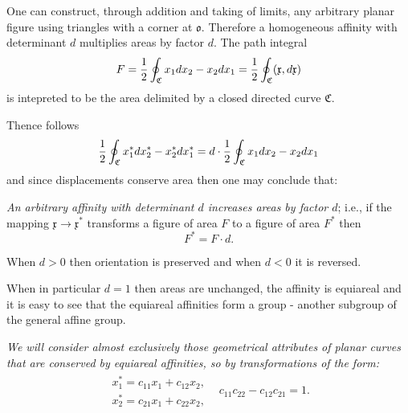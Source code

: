 \documentclass[11pt]{book} \usepackage{amssymb}
\newcommand{\myvec}[1]{\mathfrak{#1}}
\newcommand{\vecx}{\myvec{x}}
\begin{document}
One can construct, through addition and taking of limits, any arbitrary 
planar figure using triangles with a corner at $\myvec{o}$. Therefore a 
homogeneous affinity with determinant $d$ multiplies areas by factor $d$.
The path integral
\begin{equation}
  \label{eq:curve_area}
  F={1\over 2}\oint_\mathfrak{C}x_1dx_2-x_2dx_1
  ={1\over 2}\oint_\mathfrak{C}(\vecx,d\vecx)
\end{equation}
is intepreted to be the area delimited by a closed directed curve 
$\mathfrak{C}$.
\begin{figure}[htp]
  \begin{center}
  \end{center}
  \caption{}
\end{figure}
Thence follows
\begin{equation}
  \label{eq:area_transformation}
  {1\over 2}\oint_\mathfrak{C}x^*_1dx^*_2-x^*_2dx^*_1
  =d\cdot{1\over 2}\oint_\mathfrak{C}x_1dx_2-x_2dx_1
\end{equation}
and since displacements conserve area then one may conclude that:

{\em An arbitrary affinity with determinant $d$ increases areas by factor $d$};
i.e., if the mapping $\vecx\to\vecx^*$ transforms a figure of area $F$
to a figure of area $F^*$ then
\begin{equation}
  \label{eq:area_transform2}
  F^*=F\cdot d.
\end{equation}

When $d>0$ then orientation is preserved and when $d<0$ it is reversed.

When in particular $d=1$ then areas are unchanged, the affinity is equiareal
and it is easy to see that the equiareal affinities form a group - another
subgroup of the general affine group.

{\em We will consider almost exclusively those geometrical attributes of
planar curves that are conserved by equiareal affinities, so by transformations
of the form:}
\begin{equation}
  \label{eq:equiareal_affinities}
  \begin{array}{ll}
    \begin{array}{l}
      x_1^*=c_{11}x_1+c_{12}x_2,\\
      x_2^*=c_{21}x_1+c_{22}x_2,
    \end{array}
    & c_{11}c_{22}-c_{12}c_{21}=1.
  \end{array}
\end{equation}
\end{document}
